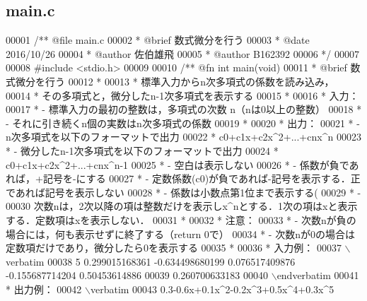 \subsection{main.\-c}

\begin{DoxyCode}
00001 \textcolor{comment}{/** @file main.c}
00002 \textcolor{comment}{ *  @brief  数式微分を行う}
00003 \textcolor{comment}{ *  @date   2016/10/26}
00004 \textcolor{comment}{ *  @author 佐伯雄飛}
00005 \textcolor{comment}{ *  @author B162392}
00006 \textcolor{comment}{ */}
00007 
00008 \textcolor{preprocessor}{#include <stdio.h>}
00009 \textcolor{comment}{}
00010 \textcolor{comment}{/** @fn int main(void)}
00011 \textcolor{comment}{ *  @brief  数式微分を行う}
00012 \textcolor{comment}{ *}
00013 \textcolor{comment}{ *  標準入力からn次多項式の係数を読み込み，}
00014 \textcolor{comment}{ *  その多項式と，微分したn-1次多項式を表示する}
00015 \textcolor{comment}{ *}
00016 \textcolor{comment}{ *  入力：}
00017 \textcolor{comment}{ *  - 標準入力の最初の整数は，多項式の次数 n（nは0以上の整数）}
00018 \textcolor{comment}{ *  - それに引き続くn個の実数はn次多項式の係数}
00019 \textcolor{comment}{ *}
00020 \textcolor{comment}{ *  出力：}
00021 \textcolor{comment}{ *  - n次多項式を以下のフォーマットで出力}
00022 \textcolor{comment}{ *    c0+c1x+c2x^2+...+cnx^n}
00023 \textcolor{comment}{ *  - 微分したn-1次多項式を以下のフォーマットで出力}
00024 \textcolor{comment}{ *    c0+c1x+c2x^2+...+cnx^n-1}
00025 \textcolor{comment}{ *  - 空白は表示しない}
00026 \textcolor{comment}{ *  - 係数が負であれば，+記号を-にする}
00027 \textcolor{comment}{ *  - 定数係数(c0)が負であれば-記号を表示する．正であれば記号を表示しない}
00028 \textcolor{comment}{ *  - 係数は小数点第1位まで表示する(%
00029 \textcolor{comment}{ *  -}
00030 \textcolor{comment}{次数nは，2次以降の項は整数だけを表示しx^nとする．1次の項はxと表示する．定数項はxを表示しない．}
00031 \textcolor{comment}{ *}
00032 \textcolor{comment}{ *  注意：}
00033 \textcolor{comment}{ *  - 次数nが負の場合には，何も表示せずに終了する（return 0で）}
00034 \textcolor{comment}{ *  - 次数nが0の場合は定数項だけであり，微分したら0を表示する}
00035 \textcolor{comment}{ *}
00036 \textcolor{comment}{ *  入力例：}
00037 \textcolor{comment}{\(\backslash\)verbatim}
00038 \textcolor{comment}{5 0.299015168361 -0.634498680199 0.076517409876 -0.155687714204 0.50453614886}
00039 \textcolor{comment}{0.260700633183}
00040 \textcolor{comment}{\(\backslash\)endverbatim}
00041 \textcolor{comment}{  *  出力例：}
00042 \textcolor{comment}{\(\backslash\)verbatim}
00043 \textcolor{comment}{0.3-0.6x+0.1x^2-0.2x^3+0.5x^4+0.3x^5}
}
\end{DoxyCode}

